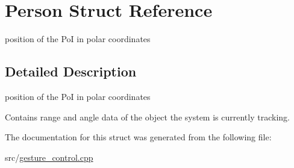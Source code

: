 \hypertarget{struct_person}{}\section{Person Struct Reference}
\label{struct_person}


position of the PoI in polar coordinates  




\subsection{Detailed Description}
position of the PoI in polar coordinates 

Contains range and angle data of the object the system is currently tracking. 

The documentation for this struct was generated from the following file\+:\begin{DoxyCompactItemize}
\item 
src/\hyperlink{gesture__control_8cpp}{gesture\+\_\+control.\+cpp}\end{DoxyCompactItemize}

